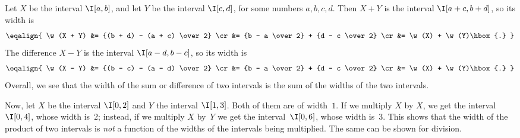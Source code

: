 Let $X$ be the interval $\I[a,b]$, and let $Y$ be the interval $\I[c,d]$, for some numbers $a, b, c, d$.  Then $X+Y$ is the interval $\I[a+c, b+d]$, so its width is
$$
\def\w{\mathop{\rm width}}
\eqalign{
\w(X + Y) &= {(b + d) - (a + c) \over 2} \cr
          &= {b - a \over 2} + {d - c \over 2} \cr
          &= \w(X) + \w(Y)\hbox{.}
}
$$
The difference $X-Y$ is the interval $\I[a - d, b - c]$, so its width is
$$
\def\w{\mathop{\rm width}}
\eqalign{
\w(X - Y) &= {(b - c) - (a - d) \over 2} \cr
          &= {b - a \over 2} + {d - c \over 2} \cr
          &= \w(X) + \w(Y)\hbox{.}
}
$$
Overall, we see that the width of the sum or difference of two intervals is the sum of the widths of the two intervals. 

Now, let $X$ be the interval $\I[0,2]$ and $Y$ the interval $\I[1,3]$.  Both of them are of width~$1$.  If we multiply $X$ by $X$, we get the interval~$\I[0,4]$, whose width is~$2$;  instead, if we multiply $X$ by~$Y$ we get the interval~$\I[0,6]$, whose width is~$3$.  This shows that the width of the product of two intervals is {\em not} a function of the widths of the intervals being multiplied.  The same can be shown for division.
